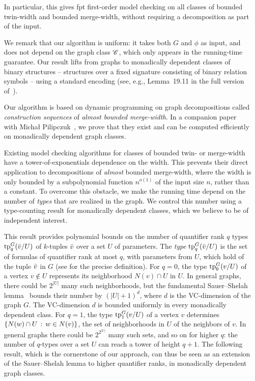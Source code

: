 In particular, this gives fpt first-order model checking on all classes of bounded twin-width and bounded merge-width, without requiring a decomposition as part of the input. 

We remark that our algorithm is uniform:
it takes both $G$ and $\phi$ as input, and does not depend on the graph class $\mathscr C$, which only appears in the running-time guarantee.
Our result lifts from graphs to monadically dependent classes of binary structures -- structures over a fixed signature consisting of binary relation symbols -- using a standard encoding (see, e.g., Lemma~19.11 in the full version of~\cite{flip-breakability}).



\medskip
Our algorithm is based on dynamic programming on graph decompositions called \emph{construction sequences} of \emph{almost bounded merge-width}.
In a companion paper with Michał Pilipczuk~\cite{md-abmw}, we prove that they exist and can be computed efficiently on monadically dependent graph classes.

Existing model checking algorithms for classes of bounded twin- or merge-width have a tower-of-exponentials dependence on the width. This prevents their direct application to decompositions of \emph{almost} bounded merge-width, where the width is only bounded by a subpolynomial function $n^{o(1)}$ of the input size $n$, rather than a constant. 
To overcome this obstacle, we make the running time depend on the number of \emph{types} that are realized in the graph. We control this number using a type-counting result for monadically dependent classes, which we believe to be of independent interest.

This result provides polynomial bounds on the number of quantifier rank $q$ types $\textnormal{tp}_q^G(\bar v/U)$ of $k$-tuples $\bar v$ over a set $U$ of parameters.
The \emph{type} $\textnormal{tp}_q^G(\bar v/U)$ is the set of formulas of quantifier rank at most \(q\), with parameters from \(U\), which hold of the tuple $\bar v$ in $G$
(see  for the precise definition).
For $q=0$, the type $\textnormal{tp}_0^G(v/U)$ of a vertex $v\notin U$ represents its neighborhood $N(v)\cap U$ in $U$. 
In general graphs, there could be $2^{|U|}$ many such neighborhoods, but the fundamental Sauer--Shelah lemma~\cite{Sauer72,She72} bounds their number by $(|U|+1)^d$, where $d$ is the VC-dimension of the graph $G$.
The VC-dimension $d$ is bounded uniformly in every monadically dependent class.
For $q=1$, the type $\textnormal{tp}_1^G(v/U)$ of a vertex $v$ 
determines $\{N(w)\cap U \,:\, w\in N(v) \}$, the set of neighborhoods in $U$ of the neighbors of $v$. In general graphs there could be 
$2^{2^{|U|}}$ many such sets, and so on for higher $q$: the number of $q$-types over a set $U$ can reach a tower of height $q+1$.
The following result, which is the cornerstone of our approach, can thus be seen as an extension of the Sauer--Shelah lemma to higher quantifier ranks, in monadically dependent graph classes.


